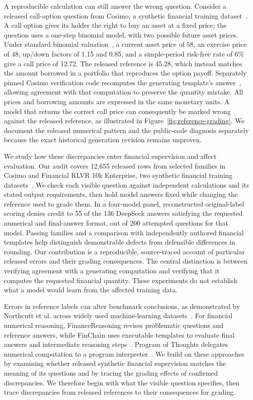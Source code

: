 A reproducible calculation can still answer the wrong question. Consider a released call-option question from Cosimo, a synthetic financial training dataset~\cite{cosimo}. A call option gives its holder the right to buy an asset at a fixed price; the question uses a one-step binomial model, with two possible future asset prices. Under standard binomial valuation~\cite{crr}, a current asset price of 58, an exercise price of 48, up/down factors of 1.15 and 0.85, and a simple-period risk-free rate of 6\% give a call price of 12.72. The released reference is 45.28, which instead matches the amount borrowed in a portfolio that reproduces the option payoff. Separately pinned Cosimo verification code recomputes the generating template's answer~\cite{cosimosource}, allowing agreement with that computation to preserve the quantity mistake. All prices and borrowing amounts are expressed in the same monetary units. A model that returns the correct call price can consequently be marked wrong against the released reference, as illustrated in Figure~\ref{fig:reference-grading}. We document the released numerical pattern and the public-code diagnosis separately because the exact historical generation revision remains unproven.

We study how these discrepancies enter financial supervision and affect evaluation. Our audit covers 12,655 released rows from selected families in Cosimo and Financial RLVR 10k Enterprise, two synthetic financial training datasets~\cite{cosimo,rlvr}. We check each visible question against independent calculations and its stated output requirements, then hold model answers fixed while changing the reference used to grade them. In a four-model panel, reconstructed original-label scoring denies credit to 55 of the 136 DeepSeek answers satisfying the requested numerical and final-answer format, out of 200 attempted questions for that model. Passing families and a comparison with independently authored financial templates help distinguish demonstrable defects from defensible differences in rounding. Our contribution is a reproducible, source-traced account of particular released errors and their grading consequences. The central distinction is between verifying agreement with a generating computation and verifying that it computes the requested financial quantity. These experiments do not establish what a model would learn from the affected training data.

Errors in reference labels can alter benchmark conclusions, as demonstrated by Northcutt et al. across widely used machine-learning datasets~\cite{labelerrors}. For financial numerical reasoning, FinanceReasoning revises problematic questions and reference answers, while FinChain uses executable templates to evaluate final answers and intermediate reasoning steps~\cite{financereasoning,finchain}. Program of Thoughts delegates numerical computation to a program interpreter~\cite{pot}. We build on these approaches by examining whether released synthetic financial supervision matches the meaning of its questions and by tracing the grading effects of confirmed discrepancies. We therefore begin with what the visible question specifies, then trace discrepancies from released references to their consequences for grading.

